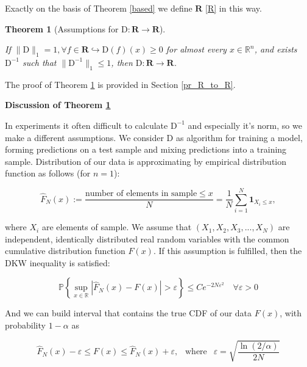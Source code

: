 \documentclass{article}
\newtheorem{theorem}{Theorem}
\begin{document}
    Exactly on the basis of Theorem \ref{based} we define $\mathbf{R}$ \eqref{R} in this way.

    \begin{theorem}[Assumptions for $\text{D}: \mathbf{R} \to \mathbf{R}$] \label{R_to_R}
    
        If $\|\text{D}\|_1 = 1, \forall f \in \mathbf{R} \hookrightarrow \text{D}(f)(x) \geq 0$ for almost every $x \in \mathbb{R}^n$, and exists $\text{D}^{-1}$ such that $\|\text{D}^{-1}\|_1 \leq 1$, then $\text{D} : \mathbf{R} \to \mathbf{R}$.
        
    \end{theorem}

    The proof of Theorem \ref{R_to_R} is provided in Section \ref{pr_R_to_R}.

    \textbf{Discussion of Theorem \ref{R_to_R}}

    In experiments it often difficult to calculate $\text{D}^{-1}$ and especially it's norm, so we make a different assumptions. We consider $\text{D}$ as algorithm for training a model, forming predictions on a test sample and mixing predictions into a training sample. Distribution of our data is approximating by empirical distribution function \cite{dvoretzky1956asymptotic} as follows (for $n=1$):

    \begin{equation}\label{F_approx}
        \hat{F}_N(x) := \dfrac{\text{number of elements in sample} \leq x}{N} = \dfrac{1}{N}\sum\limits_{i=1}^N \textbf{1}_{X_i \leq x},
    \end{equation}

    where $X_i$ are elements of sample. We assume that $(X_1, X_2, X_3, ... , X_N)$ are independent, identically distributed real random variables with the common cumulative distribution function $F(x)$. If this assumption is fulfilled, then the DKW inequality is satisfied:

    \begin{equation}\label{DKW}
        \mathbb{P}\left\{\underset{x \in \mathbb{R}}{\sup}\left|\hat{F}_N(x) - F(x)\right| > \varepsilon \right\} \leq C e^{-2N\varepsilon^2} \quad 
        \forall \varepsilon > 0
    \end{equation}

    And we can build interval that contains the true CDF of our data $F(x)$, with probability $1 - \alpha$ as

    \begin{equation}\label{inter}
        \hat{F}_N(x) - \varepsilon \leq F(x) \leq \hat{F}_N(x) + \varepsilon, ~~ \text{ where } ~~ \varepsilon = \sqrt{\dfrac{\ln(2/\alpha)}{2N}}
    \end{equation}
\end{document}
